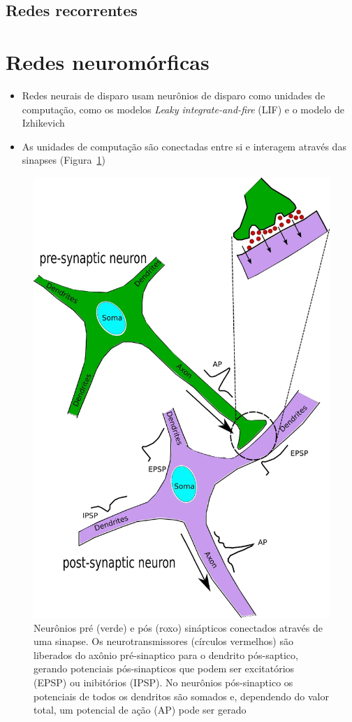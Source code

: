 \subsection{Redes recorrentes}

\section{Redes neuromórficas}\label{sec:redesneuromorficas}

\begin{itemize}
	\item Redes neurais de disparo usam neurônios de disparo como unidades de computação, como os modelos \textit{Leaky integrate-and-fire} (LIF) e o modelo de Izhikevich
	\item As unidades de computação são conectadas entre si e interagem através das sinapses (Figura~\ref{fig:sinapse})
\end{itemize}

\begin{figure}[htb!]
	\centering
	\caption{Neurônios pré (verde) e pós (roxo) sinápticos conectados através de uma sinapse. Os neurotransmissores (círculos vermelhos) são liberados do axônio pré-sinaptico para o dendrito pós-saptico, gerando potenciais pós-sinapticos que podem ser excitatórios (EPSP) ou inibitórios (IPSP). No neurônios pós-sinaptico os potenciais de todos os dendritos são somados e, dependendo do valor total, um potencial de ação (AP) pode ser gerado}
	\label{fig:sinapse}
	\includegraphics[width=0.3\linewidth]{figs/sinapse}
\end{figure}

